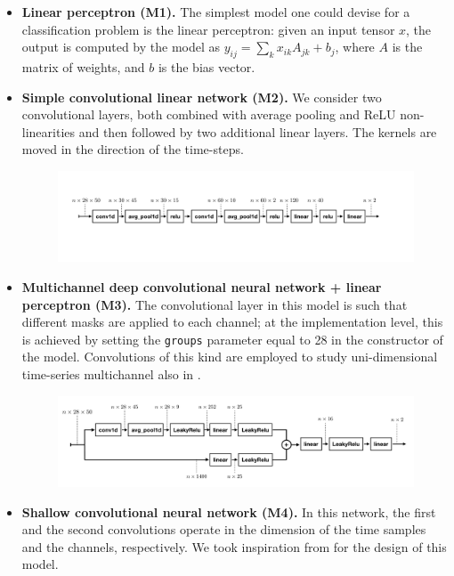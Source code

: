 \documentclass{article}
\begin{document}
\begin{itemize}
\item \textbf{Linear perceptron (M1).} 
The simplest model one could devise for a classification problem is the linear perceptron:  given an input tensor $x$, the output is computed by the model as $y_{ij} = \sum_{k}x_{ik} A_{jk} + b_{j}$, where $A$ is the matrix of weights, and $b$ is the bias vector.

\item \textbf{Simple convolutional linear network (M2).} 
We consider two convolutional layers, both  combined with average pooling and ReLU non-linearities and then followed by two additional linear layers. 
The kernels are moved in the direction of the time-steps.
\begin{figure}[h!]
\centering
\includegraphics[width=\textwidth, clip=true,trim=100 300 295 230]{fig/conv1.pdf}
\end{figure}

\item \textbf{Multichannel deep convolutional neural network + linear perceptron (M3).}
The convolutional layer in this model is such that  different masks are applied to each channel; at the implementation level, this is achieved by setting the \verb|groups| parameter equal to 28 in the constructor of the model. Convolutions of this kind are employed to study  uni-dimensional time-series multichannel also in \cite{zheng2014time}.
\begin{figure}[h!]
\centering
\includegraphics[width=\textwidth, clip=true,trim=30 40 70 50]{fig/conv2.pdf}
\end{figure}

\item \textbf{Shallow convolutional neural network (M4).}
In this network, the first and the second convolutions operate in the dimension of the time samples and the channels, respectively. 
We took inspiration from \cite{schirrmeister2017deep} for the design of this model.
\end{itemize}
\end{document}

